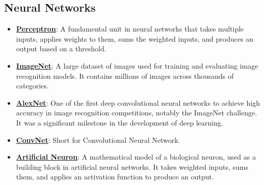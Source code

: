 \documentclass{article}%
\begin{document}
%
\subsection{Neural Networks}%
\label{subsec:NeuralNetworks}%
\begin{itemize}[leftmargin=*]%
\item \href{https://purdue.brightspace.com/d2l/common/assets/pdfjs-d2l-dist/1.0.14-legacy/web/viewer.html?file=%2Fcontent%2Fenforced%2F1095467-wl.202510.CS.24300.001%2F02L2-Intro.pdf%3Fou%3D1095467&lang=en-us&container=d2l-fileviewer-rendered-pdf&fullscreen=d2l-fileviewer-rendered-pdf-dialog&height=667#page=45}{\textbf{Perceptron}}: A fundamental unit in neural networks that takes multiple inputs, applies weights to them, sums the weighted inputs, and produces an output based on a threshold.%
\item \href{https://purdue.brightspace.com/d2l/common/assets/pdfjs-d2l-dist/1.0.14-legacy/web/viewer.html?file=%2Fcontent%2Fenforced%2F1095467-wl.202510.CS.24300.001%2F09L1-cnn.pdf%3Fou%3D1095467&lang=en-us&container=d2l-fileviewer-rendered-pdf&fullscreen=d2l-fileviewer-rendered-pdf-dialog&height=667#page=3}{\textbf{ImageNet}}: A large dataset of images used for training and evaluating image recognition models. It contains millions of images across thousands of categories.%
\item \href{https://purdue.brightspace.com/d2l/common/assets/pdfjs-d2l-dist/1.0.14-legacy/web/viewer.html?file=%2Fcontent%2Fenforced%2F1095467-wl.202510.CS.24300.001%2F09L1-cnn.pdf%3Fou%3D1095467&lang=en-us&container=d2l-fileviewer-rendered-pdf&fullscreen=d2l-fileviewer-rendered-pdf-dialog&height=667#page=3}{\textbf{AlexNet}}: One of the first deep convolutional neural networks to achieve high accuracy in image recognition competitions, notably the ImageNet challenge. It was a significant milestone in the development of deep learning.%
\item \href{https://purdue.brightspace.com/d2l/common/assets/pdfjs-d2l-dist/1.0.14-legacy/web/viewer.html?file=%2Fcontent%2Fenforced%2F1095467-wl.202510.CS.24300.001%2F09L1-cnn.pdf%3Fou%3D1095467&lang=en-us&container=d2l-fileviewer-rendered-pdf&fullscreen=d2l-fileviewer-rendered-pdf-dialog&height=667#page=4}{\textbf{ConvNet}}: Short for Convolutional Neural Network.%
\item \href{https://purdue.brightspace.com/d2l/common/assets/pdfjs-d2l-dist/1.0.14-legacy/web/viewer.html?file=%2Fcontent%2Fenforced%2F1095467-wl.202510.CS.24300.001%2F09L1-cnn.pdf%3Fou%3D1095467&lang=en-us&container=d2l-fileviewer-rendered-pdf&fullscreen=d2l-fileviewer-rendered-pdf-dialog&height=667#page=5}{\textbf{Artificial Neuron}}: A mathematical model of a biological neuron, used as a building block in artificial neural networks. It takes weighted inputs, sums them, and applies an activation function to produce an output.%

\end{itemize}
\end{document}
